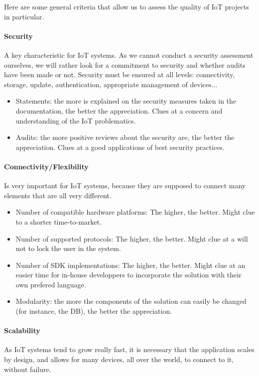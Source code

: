 \documentclass{article}
\begin{document}
Here are some general criteria that allow us to assess the quality of IoT projects in particular.

\paragraph{Security} A key characteristic for IoT systems. As we cannot conduct a security assessment ourselves, we will rather look for a commitment to security and whether audits have been made or not. Security must be ensured at all levels: connectivity, storage, update, authentication, appropriate management of devices...

\begin{itemize}
\item Statements: the more is explained on the security measures taken in the documentation, the better the appreciation. Clues at a concern and understanding of the IoT problematics.
\item Audits: the more positive reviews about the security are, the better the appreciation. Clues at a good applications of best security practices.
\end{itemize}

\paragraph{Connectivity/Flexibility} Is very important for IoT systems, because they are supposed to connect many elements that are all very different.

\begin{itemize}
\item Number of compatible hardware platforms: The higher, the better. Might clue to a shorter time-to-market.
\item Number of supported protocols: The higher, the better. Might clue at a will not to lock the user in the system.
\item Number of SDK implementations: The higher, the better. Might clue at an easier time for in-house developpers to incorporate the solution with their own prefered language.
\item Modularity: the more the components of the solution can easily be changed (for instance, the DB), the better the appreciation.
\end{itemize}

\paragraph{Scalability} As IoT systems tend to grow really fast, it is necessary that the application scales by design, and allows for many devices, all over the world, to connect to it, without failure.
\end{document}
